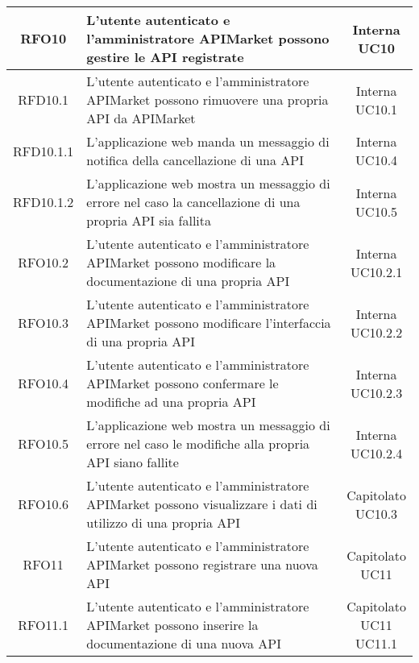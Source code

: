 \begin{longtable}{|c|m{8cm}|c|}
RFO10 & L'utente autenticato e l'amministratore APIMarket possono gestire le API registrate & \makecell*{Interna\\UC10} \\
\hline

RFD10.1 & L'utente autenticato e l'amministratore APIMarket possono rimuovere una propria API da APIMarket & \makecell*{Interna\\UC10.1} \\
\hline

RFD10.1.1 & L'applicazione web manda un messaggio di notifica della cancellazione di una API & \makecell*{Interna\\UC10.4} \\
\hline
RFD10.1.2 & L'applicazione web mostra un messaggio di errore nel caso la cancellazione di una propria API sia fallita & \makecell*{Interna\\UC10.5} \\
\hline

RFO10.2 & L'utente autenticato e l'amministratore APIMarket possono modificare la documentazione di una propria API & \makecell*{Interna\\UC10.2.1} \\
\hline
RFO10.3 & L'utente autenticato e l'amministratore APIMarket possono modificare l'interfaccia di una propria API & \makecell*{Interna\\UC10.2.2} \\
\hline
RFO10.4 & L'utente autenticato e l'amministratore APIMarket possono confermare le modifiche ad una propria API & \makecell*{Interna\\UC10.2.3} \\
\hline
RFO10.5 & L'applicazione web mostra un messaggio di errore nel caso le modifiche alla propria API siano fallite & \makecell*{Interna\\UC10.2.4} \\
\hline
RFO10.6 & L'utente autenticato e l'amministratore APIMarket possono visualizzare i dati di utilizzo di una propria API & \makecell*{Capitolato\\UC10.3} \\
\hline

RFO11 & L'utente autenticato e l'amministratore APIMarket possono registrare una nuova API & \makecell*{Capitolato\\UC11} \\
\hline

RFO11.1 & L'utente autenticato e l'amministratore APIMarket possono inserire la documentazione di una nuova API & \makecell*{Capitolato\\UC11\\UC11.1} \\
\hline


\end{longtable}
